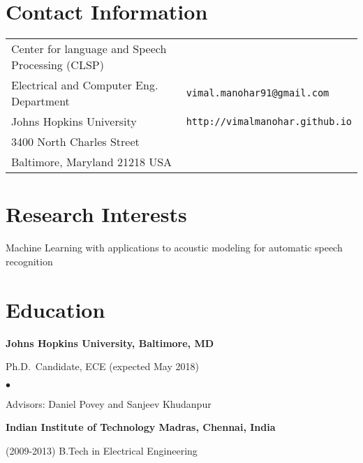 \documentclass[margin,line,pifont,palatino,courier]{res}
\newenvironment{list1}{
  \begin{list}{\ding{113}}{%
      \setlength{\itemsep}{0in}
      \setlength{\parsep}{0in} \setlength{\parskip}{0in}
      \setlength{\topsep}{0in} \setlength{\partopsep}{0in}
      \setlength{\leftmargin}{0.17in}}}{\end{list}}
\newenvironment{list2}{
  \begin{list}{$\bullet$}{%
      \setlength{\itemsep}{0in}
      \setlength{\parsep}{0in} \setlength{\parskip}{0in}
      \setlength{\topsep}{0in} \setlength{\partopsep}{0in}
      \setlength{\leftmargin}{0.2in}}}{\end{list}}
\begin{document}

\begin{resume}

\section{\sc Contact Information}

\vspace{.05in}
\begin{tabular}{@{}p{2.75in}p{2in}}
Center for language and Speech Processing (CLSP) \\
Electrical and Computer Eng. Department                        & \verb+vimal.manohar91@gmail.com+\\
Johns Hopkins University                  & \verb+http://vimalmanohar.github.io+\\
3400 North Charles Street               & \\
Baltimore, Maryland 21218 USA               & \\
\end{tabular}

\section{\sc Research Interests}
Machine Learning with applications to acoustic modeling for automatic speech recognition

\section{\sc Education}

\textbf{Johns Hopkins University, Baltimore, MD} \\
\vspace*{-.1in}
\begin{list1}
\item[] Ph.D.~Candidate, ECE (expected May 2018)

\begin{list2}
\vspace*{.05in}
\item Advisors: Daniel Povey and Sanjeev Khudanpur
\end{list2}
\end{list1}

\textbf{Indian Institute of Technology Madras, Chennai, India} \\
\vspace*{-.1in}
\begin{list1}
\item[(2009-2013)] B.Tech in Electrical Engineering


\end{list1}
\end{resume}
\end{document}

